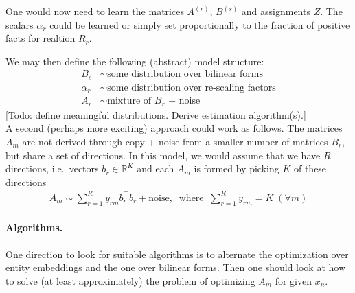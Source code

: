\documentclass{article}
\renewcommand{\Re}{{\mathbb R}}
\begin{document}
One would now need to learn the matrices $A^{(r)}$, $B^{(s)}$ and assignments $Z$. The scalars $\alpha_r$  could be learned or simply set proportionally to the fraction of positive facts for realtion $R_r$. 

\newpage


We may then define the following (abstract) model structure: 
\begin{align}
B_{s} & \sim \text{some distribution over bilinear forms}  \\
\alpha_r & \sim \text{some distribution over re-scaling factors} \\
A_r & \sim \text{mixture of $B_r$ + noise}
\end{align}
[Todo: define meaningful distributions. Derive estimation algorithm(s).] \\

A second (perhaps more exciting) approach could work as follows. The matrices $A_m$ are not derived through copy + noise from a smaller number of matrices $B_r$, but share a set of directions. In this model, we would assume that we have $R$ directions, i.e.~vectors $b_r \in \Re^K$ and each $A_m$ is formed by picking $K$ of these directions 
\begin{align} 
A_m \sim \sum_{r=1}^R y_{rm} b_r^\top b_r + \text{noise}, \;\; \text{where}  \;\; \sum_{r=1}^R y_{rm} = K \; (\forall m)
\end{align} 

\paragraph{Algorithms.} One direction to look for suitable algorithms is to alternate the optimization over entity embeddings and the one over bilinear forms. Then one should look at how to solve (at least approximately) the problem of optimizing $A_m$ for given $x_n$.

 
 
\end{document}
